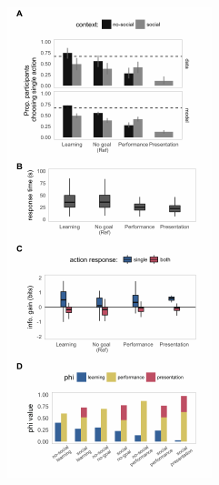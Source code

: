 \documentclass[10pt, letterpaper]{article}
\newenvironment{CodeChunk}{}{}
\begin{document}
\begin{CodeChunk}
\begin{figure}[H]

{\centering \includegraphics[width=0.95\linewidth]{figs/e2_results-1} 

}
\end{figure}
\end{CodeChunk}
\end{document}
